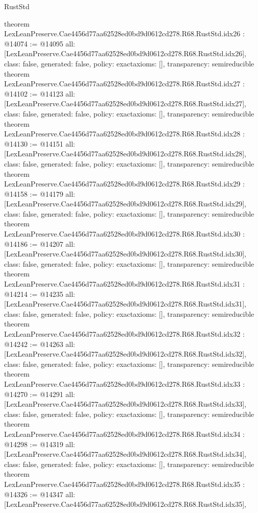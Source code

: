 \begin{lexlean}{RustStd}
\begin{coremodule}
{}
theorem LexLeanPreserve.Cae4456d77aa62528ed0bd9d0612cd278.R68.RustStd.idx26 : @14074 := @14095 {
  all: [LexLeanPreserve.Cae4456d77aa62528ed0bd9d0612cd278.R68.RustStd.idx26],
  class: false,
  generated: false,
  policy: exact{axioms: []},
  transparency: semireducible
}
theorem LexLeanPreserve.Cae4456d77aa62528ed0bd9d0612cd278.R68.RustStd.idx27 : @14102 := @14123 {
  all: [LexLeanPreserve.Cae4456d77aa62528ed0bd9d0612cd278.R68.RustStd.idx27],
  class: false,
  generated: false,
  policy: exact{axioms: []},
  transparency: semireducible
}
theorem LexLeanPreserve.Cae4456d77aa62528ed0bd9d0612cd278.R68.RustStd.idx28 : @14130 := @14151 {
  all: [LexLeanPreserve.Cae4456d77aa62528ed0bd9d0612cd278.R68.RustStd.idx28],
  class: false,
  generated: false,
  policy: exact{axioms: []},
  transparency: semireducible
}
theorem LexLeanPreserve.Cae4456d77aa62528ed0bd9d0612cd278.R68.RustStd.idx29 : @14158 := @14179 {
  all: [LexLeanPreserve.Cae4456d77aa62528ed0bd9d0612cd278.R68.RustStd.idx29],
  class: false,
  generated: false,
  policy: exact{axioms: []},
  transparency: semireducible
}
theorem LexLeanPreserve.Cae4456d77aa62528ed0bd9d0612cd278.R68.RustStd.idx30 : @14186 := @14207 {
  all: [LexLeanPreserve.Cae4456d77aa62528ed0bd9d0612cd278.R68.RustStd.idx30],
  class: false,
  generated: false,
  policy: exact{axioms: []},
  transparency: semireducible
}
theorem LexLeanPreserve.Cae4456d77aa62528ed0bd9d0612cd278.R68.RustStd.idx31 : @14214 := @14235 {
  all: [LexLeanPreserve.Cae4456d77aa62528ed0bd9d0612cd278.R68.RustStd.idx31],
  class: false,
  generated: false,
  policy: exact{axioms: []},
  transparency: semireducible
}
theorem LexLeanPreserve.Cae4456d77aa62528ed0bd9d0612cd278.R68.RustStd.idx32 : @14242 := @14263 {
  all: [LexLeanPreserve.Cae4456d77aa62528ed0bd9d0612cd278.R68.RustStd.idx32],
  class: false,
  generated: false,
  policy: exact{axioms: []},
  transparency: semireducible
}
theorem LexLeanPreserve.Cae4456d77aa62528ed0bd9d0612cd278.R68.RustStd.idx33 : @14270 := @14291 {
  all: [LexLeanPreserve.Cae4456d77aa62528ed0bd9d0612cd278.R68.RustStd.idx33],
  class: false,
  generated: false,
  policy: exact{axioms: []},
  transparency: semireducible
}
theorem LexLeanPreserve.Cae4456d77aa62528ed0bd9d0612cd278.R68.RustStd.idx34 : @14298 := @14319 {
  all: [LexLeanPreserve.Cae4456d77aa62528ed0bd9d0612cd278.R68.RustStd.idx34],
  class: false,
  generated: false,
  policy: exact{axioms: []},
  transparency: semireducible
}
theorem LexLeanPreserve.Cae4456d77aa62528ed0bd9d0612cd278.R68.RustStd.idx35 : @14326 := @14347 {
  all: [LexLeanPreserve.Cae4456d77aa62528ed0bd9d0612cd278.R68.RustStd.idx35],
}
\end{coremodule}
\end{lexlean}
